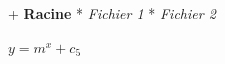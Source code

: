 \documentclass[varwidth]{standalone}
\begin{document}
\begin{homemadeverb}
+ \textbf{Racine}
  * \emph{Fichier 1}
  * \emph{Fichier 2}
\end{homemadeverb}


\begin{homemadeverb}[\color{ForestGreen}\ttfamily]
$y = m^x + c_5$
\end{homemadeverb}
\end{document}
